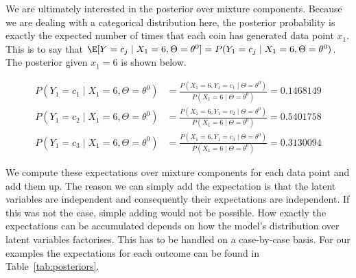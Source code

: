 We are ultimately interested in the posterior over mixture components. Because we are dealing with a categorical
distribution here, the posterior probability is exactly the expected
number of times that each coin has generated data point $ x_{1} $. This is to say that
$\E[Y=c_{j} \mid X_{1}=6, \Theta = \theta^{0}] = P(Y_{1}=c_{j} \mid X_{1}=6, \Theta=\theta^{0}) $. The
posterior given $ x_{1}=6 $ is shown below.
\begin{knitrout}
\color{fgcolor}\begin{kframe}
\begin{alltt}
 \hlkwb{=}  \hlopt{==} \hlstd{data[}\hlstd{])}
\end{alltt}
\end{kframe}
\end{knitrout}
\begin{align}\label{eq:posterior}
P(Y_{1} = c_{1} \mid X_{1}=6,\Theta= \theta^{0}) &= \frac{P(X_{1}=6,Y_{1} = c_{1} \mid \Theta= \theta^{0})}{P(X_1 = 6 \mid \Theta= \theta^{0})} = 0.1468149 \\
P(Y_{1} = c_{2} \mid X_{1}=6,\Theta= \theta^{0}) &= \frac{P(X_{1}=6,Y_{1} = c_{2} \mid \Theta= \theta^{0})}{P(X_1 = 6 \mid \Theta= \theta^{0})} = 0.5401758 \nonumber \\
P(Y_{1} = c_{3} \mid X_{1}=6,\Theta= \theta^{0}) &= \frac{P(X_{1}=6,Y_{1} = c_{3} \mid \Theta= \theta^{0})}{P(X_1 = 6 \mid \Theta= \theta^{0})} = 0.3130094 \nonumber
\end{align}

We compute these expectations over mixture components for each data point and add them up. The reason we can simply add the expectation is that
the latent variables are independent and consequently their expectations are independent. If this was not the case, simple adding would not
be possible. How exactly the expectations can be accumulated depends on how the model's distribution over latent variables factorises. This has to
be handled on a case-by-case basis. For our examples the expectations for each outcome can be found in Table~\ref{tab:posteriors}.

